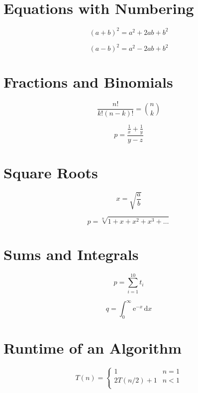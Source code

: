 \documentclass{report}
\begin{document}
\section{Equations with Numbering}
\begin{equation}
(a+b)^2 = a^2+2ab+b^2
\end{equation}

\begin{equation}
(a-b)^2 = a^2-2ab+b^2
\end{equation}

\section{Fractions and Binomials}

\begin{equation}
\frac{n!}{k!(n-k)!} = \binom{n}{k}
\label{binomial}
\end{equation}

\begin{equation}
p=\frac{\frac{1}{x}+\frac{1}{y}}{y-z}
\end{equation}

\section{Square Roots}
\begin{displaymath}
x=\sqrt{\frac{a}{b}}
\end{displaymath}

\begin{displaymath}
p=\sqrt[n]{1+x+x^2+x^3+\ldots}
\end{displaymath}
\section{Sums and Integrals}
\begin{displaymath}
p=\sum_{i=1}^{10} t_i
\end{displaymath}

\begin{displaymath}
q=\int_0^\infty \mathrm{e}^{-x}\,\mathrm{d}x
\end{displaymath}

\section{Runtime of an Algorithm}
\begin{displaymath}
T(n)=\begin{cases}
1& n=1\\
2T(n/2)+1 & n < 1\\
\end{cases}
\end{displaymath}
\end{document}
